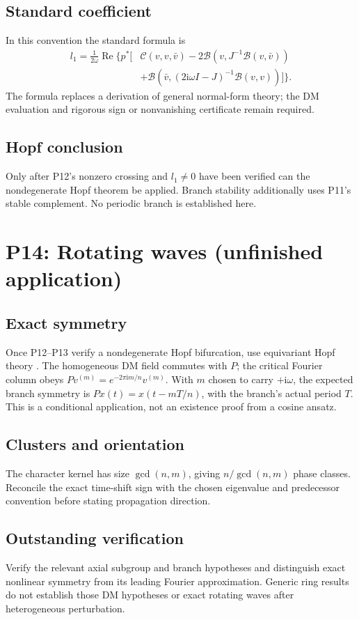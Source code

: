 \documentclass[11pt]{article}
\let\OriginalCite\cite
\renewcommand{\cite}[2][]{%
  \textcolor{CitationRed}{%
    \if\relax\detokenize{#1}\relax
      \OriginalCite{#2}%
    \else
      \OriginalCite[#1]{#2}%
    \fi}}
\newcommand{\ii}{\mathrm{i}}
\DeclareMathOperator{\Ree}{Re}
\theoremstyle{definition}
\theoremstyle{remark}
\begin{document}
\subsection{Standard coefficient}\label{slot:P13-3}
In this convention the standard formula is \cite{KuznetsovHopf2006}
\begin{align*}
 l_1=\frac1{2\omega}\Ree\bigl\{p^*\bigl[
 &\mathcal C(v,v,\bar v)-2\mathcal B(v,J^{-1}\mathcal B(v,\bar v))\\
 &+\mathcal B(\bar v,(2\ii\omega I-J)^{-1}\mathcal B(v,v))\bigr]\bigr\}.
\end{align*}
The formula replaces a derivation of general normal-form theory; the DM
evaluation and rigorous sign or nonvanishing certificate remain required.
\subsection{Hopf conclusion}\label{slot:P13-4}
Only after P12's nonzero crossing and $l_1\ne0$ have been verified can
the nondegenerate Hopf theorem be applied. Branch stability additionally
uses P11's stable complement. No periodic branch is established here.


\section{P14: Rotating waves (unfinished application)}
\label{sec:P14}
\subsection{Exact symmetry}\label{slot:P14-1}
Once P12--P13 verify a nondegenerate Hopf bifurcation, use equivariant
Hopf theory \cite[Theorem~3.7]{Stewart2024}. The homogeneous DM field
commutes with $P$; the critical Fourier column obeys
$Pv^{(m)}=e^{-2\pi\ii m/n}v^{(m)}$. With $m$ chosen to carry
$+\ii\omega$, the expected branch symmetry is
$Px(t)=x(t-mT/n)$, with the branch's actual period $T$.
This is a conditional application, not an existence proof from a cosine ansatz.
\subsection{Clusters and orientation}\label{slot:P14-2}
The character kernel has size $\gcd(n,m)$, giving $n/\gcd(n,m)$
phase classes. Reconcile the exact time-shift sign with the chosen
eigenvalue and predecessor convention before stating propagation direction.
\subsection{Outstanding verification}\label{slot:P14-3}
Verify the relevant axial subgroup and branch hypotheses and distinguish
exact nonlinear symmetry from its leading Fourier approximation.
Generic ring results do not establish those DM hypotheses or exact
rotating waves after heterogeneous perturbation.
\end{document}
